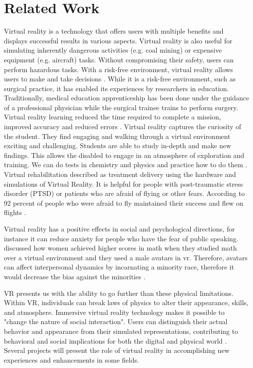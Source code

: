   
\section{Related Work}

Virtual reality is a technology that offers users with multiple benefits and displays successful results in various aspects. Virtual reality is also useful for simulating inherently dangerous activities (e.g. coal mining) or expensive equipment (e.g. aircraft) tasks. Without compromising their safety, users can perform hazardous tasks. With a risk-free environment, virtual reality allows users to make and take decisions \citep{Aguinas2004}. While it is a risk-free environment, such as surgical practice, it has enabled its experiences by researchers in education. Traditionally, medical education apprenticeship has been done under the guidance of a professional physician while the surgical trainee trains to perform surgery. Virtual reality learning reduced the time required to complete a mission, improved accuracy and reduced errors \citep{Ks2009}. Virtual reality captures the curiosity of the student. They find engaging and walking through a virtual environment exciting and challenging. Students are able to study in-depth and make new findings. This allows the disabled to engage in an atmosphere of exploration and training. We can do tests in chemistry and physics and practice how to do them \citep{Pantelidis2010}. Virtual rehabilitation described as treatment delivery using the hardware and simulations of Virtual Reality. It is helpful for people with post-traumatic stress disorder (PTSD) or patients who are afraid of flying or other fears. According to 
\cite{Burdea2003} 92 percent of people who were afraid to fly maintained their success and flew on flights \citep{Burdea2003}.

Virtual reality has a positive effects in social and psychological directions, for instance it can reduce anxiety for people who have the fear of public speaking. \cite{Chang2019StereotypeOutcomes} discussed how women achieved higher scores in math when they studied math over a virtual environment and they used a male avatars in \acrshort{vr}. Therefore, avatars can affect interpersonal dynamics by incarnating a minority race, therefore it would decrease the bias against the minorities \citep{Markowitz2018ImmersiveChange, Chang2019StereotypeOutcomes}.   

 VR presents us with the ability to go further than these physical limitations. Within VR, individuals can break laws of physics to alter their appearance, skills, and atmosphere. Immersive virtual reality technology makes it possible to "change the nature of social interaction". Users can distinguish their actual behavior and appearance from their simulated representations, contributing to behavioral and social implications for both the digital and physical world \citep{Shriram2017VirtualBehavior}.
Several projects will present the role of virtual reality in accomplishing new experiences and enhancements in some fields.

